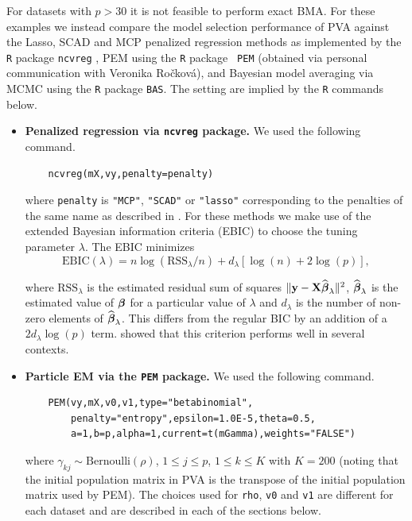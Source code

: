 For datasets with $p>30$ it is not feasible to perform exact BMA.  For these
examples we instead compare the model selection performance of PVA against the
Lasso, SCAD and MCP penalized regression methods as implemented by the {\tt R}
package {\tt ncvreg} \citep{Breheny2011}, PEM using the {\tt R} package {\tt
PEM} (obtained via personal communication with Veronika Ro\v{c}kov\'a), and
Bayesian model averaging via MCMC using the {\tt R} package {\tt BAS}.  The
setting are implied by the {\tt R} commands below.
\begin{itemize}

    \item {\bf Penalized regression via {\tt ncvreg} package.} We used the
        following command.
	\begin{verbatim}
	ncvreg(mX,vy,penalty=penalty)
	\end{verbatim}
	
    \noindent where {\tt penalty} is {\tt "MCP"}, {\tt "SCAD"} or {\tt "lasso"}
    corresponding to the penalties of the same name as described in
    \cite{Breheny2011}.  For these methods we make use of the extended Bayesian
    information criteria (EBIC) \citep{Chen2008} to choose the tuning parameter
    $\lambda$. The EBIC minimizes
	$$
	\mbox{EBIC}(\lambda) = n\log(\mbox{RSS}_\lambda/n) + d_\lambda
	\left[ \log(n) + 2\log(p) \right],
	$$
	
    \noindent where $\mbox{RSS}_\lambda$ is the estimated residual sum of
    squares $\|{\bf y} - {\bf X}\widehat{{\boldsymbol \beta}}_\lambda\|^2$,
    $\widehat{{\boldsymbol \beta}}_\lambda$ is the estimated value of ${\boldsymbol \beta}$ for a
    particular value of $\lambda$ and $d_\lambda$ is the number of non-zero
    elements of $\widehat{{\boldsymbol \beta}}_\lambda$.  This differs from the regular BIC
    by an addition of a $2 d_\lambda \log(p)$ term.  \cite{Wang2007} showed
    that this criterion performs well in several contexts.
	
    \item {\bf Particle EM via the {\tt PEM} package.} We used the following
        command.
	\begin{verbatim}
	PEM(vy,mX,v0,v1,type="betabinomial", 
	    penalty="entropy",epsilon=1.0E-5,theta=0.5, 
	    a=1,b=p,alpha=1,current=t(mGamma),weights="FALSE")
	\end{verbatim}
	
    \noindent where $\gamma_{kj} \sim \mbox{Bernoulli}(\rho)$, $1\le j\le p$,
    $1\le k\le K$ with $K=200$ (noting that the initial population matrix in
    PVA is the transpose of the initial population matrix used by PEM). The
    choices used for {\tt rho}, {\tt v0} and {\tt v1} are different for each
    dataset and are described in each of the sections below.
	

\end{itemize}
